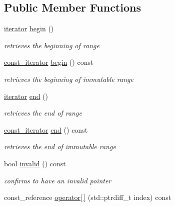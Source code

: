 \subsection*{Public Member Functions}
\begin{DoxyCompactItemize}
\item 
\hyperlink{classhryky_1_1iterator_1_1random_1_1_mutable}{iterator} \hyperlink{classhryky_1_1_scoped_array_ad37d523c285b28838258c8f25d52292f}{begin} ()
\begin{DoxyCompactList}\small\item\em retrieves the beginning of range \end{DoxyCompactList}\item 
\hyperlink{classhryky_1_1iterator_1_1random_1_1_immutable}{const\-\_\-iterator} \hyperlink{classhryky_1_1_scoped_array_af46f44b3d660894ce184b8a46675c0df}{begin} () const 
\begin{DoxyCompactList}\small\item\em retrieves the beginning of immutable range \end{DoxyCompactList}\item 
\hyperlink{classhryky_1_1iterator_1_1random_1_1_mutable}{iterator} \hyperlink{classhryky_1_1_scoped_array_ad8e02862ca4c02c24c0c27d6d74bbb28}{end} ()
\begin{DoxyCompactList}\small\item\em retrieves the end of range \end{DoxyCompactList}\item 
\hyperlink{classhryky_1_1iterator_1_1random_1_1_immutable}{const\-\_\-iterator} \hyperlink{classhryky_1_1_scoped_array_a037bc4e9b2071a052ba7f7fa82dc281d}{end} () const 
\begin{DoxyCompactList}\small\item\em retrieves the end of immutable range \end{DoxyCompactList}\item 
\hypertarget{classhryky_1_1_scoped_array_a646755893596d518d733797e283de55e}{bool \hyperlink{classhryky_1_1_scoped_array_a646755893596d518d733797e283de55e}{invalid} () const }\label{classhryky_1_1_scoped_array_a646755893596d518d733797e283de55e}

\begin{DoxyCompactList}\small\item\em confirms to have an invalid pointer \end{DoxyCompactList}\item 
\hypertarget{classhryky_1_1_scoped_array_a706a26ea220a93492fba1538b24a6178}{const\-\_\-reference \hyperlink{classhryky_1_1_scoped_array_a706a26ea220a93492fba1538b24a6178}{operator\mbox{[}$\,$\mbox{]}} (std\-::ptrdiff\-\_\-t index) const }\label{classhryky_1_1_scoped_array_a706a26ea220a93492fba1538b24a6178}


\end{DoxyCompactItemize}
